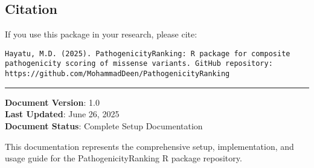 \documentclass[
  11pt,
]{article}
\begin{document}
\subsection{Citation}\label{citation}

If you use this package in your research, please cite:

\begin{verbatim}
Hayatu, M.D. (2025). PathogenicityRanking: R package for composite 
pathogenicity scoring of missense variants. GitHub repository: 
https://github.com/MohammadDeen/PathogenicityRanking
\end{verbatim}

\begin{center}\rule{0.5\linewidth}{0.5pt}\end{center}

\textbf{Document Version}: 1.0\\
\textbf{Last Updated}: June 26, 2025\\
\textbf{Document Status}: Complete Setup Documentation

This documentation represents the comprehensive setup, implementation,
and usage guide for the PathogenicityRanking R package repository.
\end{document}
